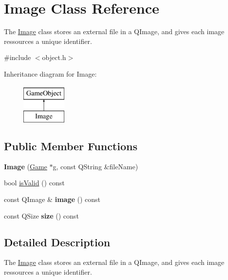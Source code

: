 \hypertarget{class_image}{\section{\-Image \-Class \-Reference}
\label{class_image}
}


\-The \hyperlink{class_image}{\-Image} class stores an external file in a \-Q\-Image, and gives each image ressources a unique identifier.  




{\ttfamily \#include $<$object.\-h$>$}

\-Inheritance diagram for \-Image\-:\begin{figure}[H]
\begin{center}
\leavevmode
\includegraphics[height=2.000000cm]{class_image}
\end{center}
\end{figure}
\subsection*{\-Public \-Member \-Functions}
\begin{DoxyCompactItemize}
\item 
\hypertarget{class_image_a86f5157575ec9c101e8c85e617bc36aa}{{\bfseries \-Image} (\hyperlink{class_game}{\-Game} $\ast$g, const \-Q\-String \&file\-Name)}\label{class_image_a86f5157575ec9c101e8c85e617bc36aa}

\item 
bool \hyperlink{class_image_a0bc052fef9ea98e416e11af385cd93b4}{is\-Valid} () const 
\item 
\hypertarget{class_image_abad14459f8cc7bea0ce1b9ce1c41bad1}{const \-Q\-Image \& {\bfseries image} () const }\label{class_image_abad14459f8cc7bea0ce1b9ce1c41bad1}

\item 
\hypertarget{class_image_a62eb0299b2a5109afb31321cba7d4fc8}{const \-Q\-Size {\bfseries size} () const }\label{class_image_a62eb0299b2a5109afb31321cba7d4fc8}

\end{DoxyCompactItemize}


\subsection{\-Detailed \-Description}
\-The \hyperlink{class_image}{\-Image} class stores an external file in a \-Q\-Image, and gives each image ressources a unique identifier. 

